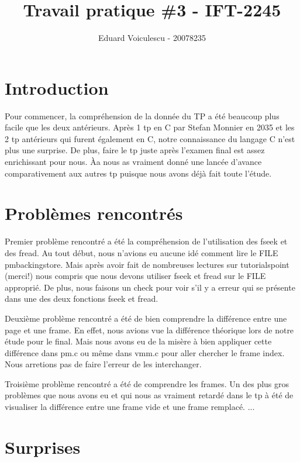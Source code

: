 \documentclass{article}
\title{Travail pratique \#3 - IFT-2245}
\author{Eduard Voiculescu - 20078235}
\begin{document}
    \maketitle

    \section{Introduction}

    Pour commencer, la compréhension de la donnée du TP a été beaucoup plus facile que les deux antérieurs. Après 1 tp en C par Stefan Monnier en 2035 et les 2 tp antérieurs qui furent également en C, notre connaissance du langage C n'est plus une surprise. De plus, faire le tp juste après l'examen final est assez enrichissant pour nous. Àa nous as vraiment donné une lancée d'avance comparativement aux autres tp puisque nous avons déjà fait toute l'étude.

    \section{Problèmes rencontrés}

    Premier problème rencontré a été la compréhension de l'utilisation des fseek et des fread. Au tout début, nous n'avions eu aucune idé comment lire le FILE pm\textunderscore backing\textunderscore store. Mais après avoir fait de nombreuses lectures sur tutorialspoint (merci!) nous compris que nous devons utiliser fseek et fread sur le FILE approprié. De plus, nous faisons un check pour voir s'il y a erreur qui se présente dans une des deux fonctions fseek et fread. \newline

    Deuxième problème rencontré a été de bien comprendre la différence entre une page et une frame. En effet, nous avions vue la différence théorique lors de notre étude pour le final. Mais nous avons eu de la misère à bien appliquer cette différence dans pm.c ou même dans vmm.c pour aller chercher le frame index. Nous arretions pas de faire l'erreur de les interchanger. \newline

    Troisième problème rencontré a été de comprendre les frames. Un des plus gros problèmes que nous avons eu et qui nous as vraiment retardé dans le tp à été de visualiser la différence entre une frame vide et une frame remplacé. ...

    \section{Surprises}
\end{document}

